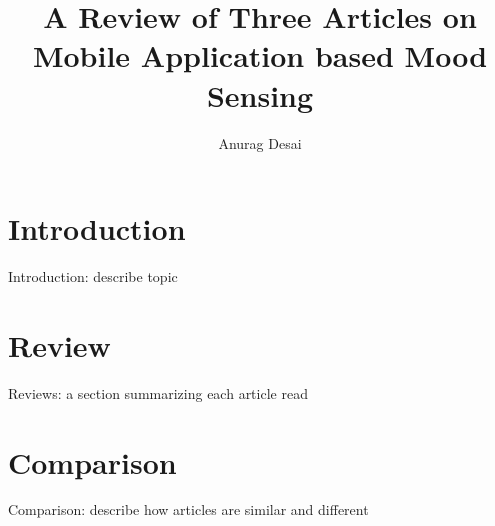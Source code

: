 \documentclass{article}
\title{A Review of Three Articles on Mobile Application based Mood Sensing}
\author{Anurag Desai}
\begin{document}
	\maketitle
	\newpage
\section{Introduction}
Introduction: describe topic
\section{Review}
Reviews: a section summarizing each article read
\section{Comparison}
Comparison: describe how articles are similar and different



\end{document}
